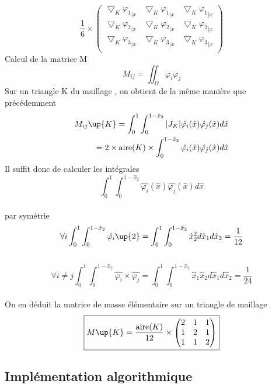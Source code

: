 \documentclass[a4paper,12pt,titlepage]{report}
\begin{document}
\begin{onehalfspace}
\[
\frac{1}{6}\times
	\begin{pmatrix}
   		\bigtriangledown_{K}{\varphi_1}_{|x} & \bigtriangledown_{K}{\varphi_1}_{|x} &  										    
   		\bigtriangledown_{K} {\varphi_1}_{|x} \\ 
    	\bigtriangledown_{K }{\varphi_2}_{|x} & \bigtriangledown_{K }{\varphi_2}_{|x} &  
    	\bigtriangledown_{K }{\varphi_2}_{|x} \\    										        
    	\bigtriangledown_{K}{\varphi_3}_{|x} & \bigtriangledown_{K}{\varphi_3}_{|x} & \bigtriangledown_{K}{\varphi_3}_{|x} \\ 
    \end{pmatrix} 
\]
Calcul de la matrice M
\[
M_{ij}=\iint_\Omega \varphi_i \varphi_j
\]
Sur un triangle K du maillage , on obtient de la même manière que précédemment 
\[
  \left.
    \begin{aligned}
		M_{ij}\up{K}=\int_0^{1}\int_0^{1-{\hat{x}}_2}|J_K|\hat{\varphi_i}(\hat{x})\hat{\varphi_j}(\hat{x})d\hat{x}\\
		=2\times\text{aire}(K)\times\int_0^{1-{\hat{x}}_2}\hat{\varphi_i}(\hat{x})\hat{\varphi_j}(\hat{x})d\hat{x}
    \end{aligned}
  \right.
\]
Il suffit donc de calculer les intégrales 
\[
	\int _0^{1}\int_0^{1-{\hat{x}}_2}\hat{\varphi_i}(\hat{x})\hat{\varphi_j}(\hat{x})d\hat{x}
\]
\\
par symétrie 
\[
	\forall i \int _0^{1}\int_0^{1-\hat{x}_{2}}\hat{\varphi_i}\up{2}= \int _0^{1} \int_0^{1-\hat{x}_{2}}\hat{x}_{2}^{2}d\hat{x}_{1}d\hat{x}_{2}=\frac{1}{12}
\]
\\%
\[
	\forall i \neq j \int _0^{1}\int_0^{1-{\hat{x}}_2}\hat{\varphi_i} \times \hat{\varphi_j}=\int _0^{1} \int_0^{1-\hat{x}_{2}}\hat{x}_{1}\hat{x}_{2}d\hat{x}_{1}d\hat{x}_{2}=\frac{1}{24}
\]
\\%
On en déduit la matrice de masse élémentaire sur un triangle de maillage 
\\%
\[
	\boxed{M\up{K}=\frac{\text{aire}(K)}{12}\times 
	\begin{pmatrix}
   		2 & 1 & 1 \\
   		1 &  2 & 1 \\
   		1 &  1 & 2
	\end{pmatrix}}
\]

\subsection{Implémentation algorithmique}


\end{onehalfspace}
\end{document}
